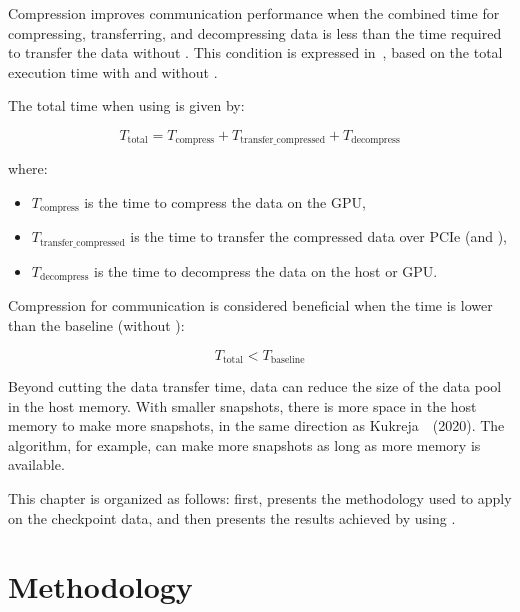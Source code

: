 \documentclass[Ingles]{ic-tese-v3}
\begin{document}
Compression improves communication performance when the combined time for compressing, transferring, and decompressing data is less than the time required to transfer the data without \compression. This condition is expressed in~, based on the total execution time with and without \compression.

The total time when using \compression is given by:

\begin{equation}
T_{\text{total}} = T_{\text{compress}} + T_{\text{transfer\_compressed}} + T_{\text{decompress}}
\label{eq:ttotal}
\end{equation}

\noindent where:
\begin{itemize}
    \item \( T_{\text{compress}} \) is the time to compress the data on the GPU,
    \item \( T_{\text{transfer\_compressed}} \) is the time to transfer the compressed data over PCIe (\dth and \htd),
    \item \( T_{\text{decompress}} \) is the time to decompress the data on the host or GPU.
\end{itemize}

Compression for communication is considered beneficial when the \compression time is lower than the baseline (without \compression):

\begin{equation}
T_{\text{total}} < T_{\text{baseline}}
\label{eq:benefit_condition}
\end{equation}

Beyond cutting the data transfer time, data \compression can reduce the size of the \checkpointing data pool in the host memory. With smaller snapshots, there is more space in the host memory to make more snapshots, in the same direction as Kukreja~\etal~(2020)\cite{kukreja2020}. The \uniform algorithm, for example, can make more snapshots as long as more memory is available.

This chapter is organized as follows: first,  presents the methodology used to apply \compression on the checkpoint data, and then  presents the results achieved by using \compression. 


\section{Methodology}
\label{sec:comp_methodology}
\end{document}
